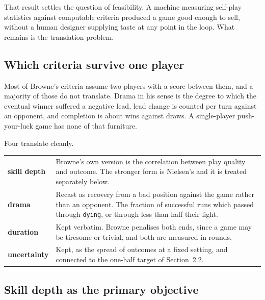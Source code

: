 \documentclass[11pt,a4paper]{article}
\begin{document}
That result settles the question of feasibility. A machine measuring self-play statistics against
computable criteria produced a game good enough to sell, without a human designer supplying
taste at any point in the loop. What remains is the translation problem.

\subsection{Which criteria survive one player}

Most of Browne's criteria assume two players with a score between them, and a majority of those
do not translate. Drama in his sense is the degree to which the eventual winner suffered a
negative lead, lead change is counted per turn against an opponent, and completion is about wins
against draws. A single-player push-your-luck game has none of that furniture.

Four translate cleanly.

\begin{center}
\begin{tabular}{@{}l@{\hspace{4mm}}>{\raggedright\arraybackslash}p{}@{}}
\toprule
\textbf{skill depth}  & Browne's own version is the correlation between play quality and outcome.
The stronger form is Nielsen's and it is treated separately below. \\[1mm]
\textbf{drama}        & Recast as recovery from a bad position against the game rather than an
opponent. The fraction of successful runs which passed through \texttt{dying}, or through less
than half their light. \\[1mm]
\textbf{duration}     & Kept verbatim. Browne penalises both ends, since a game may be tiresome
or trivial, and both are measured in rounds. \\[1mm]
\textbf{uncertainty}  & Kept, as the spread of outcomes at a fixed setting, and connected to the
one-half target of Section~2.2. \\
\bottomrule
\end{tabular}
\end{center}

\subsection{Skill depth as the primary objective}
\label{sec:depth}
\end{document}

